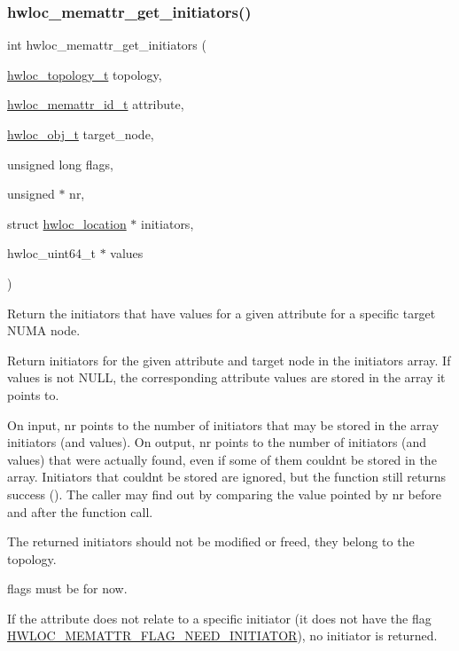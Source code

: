 \subsubsection{\texorpdfstring{hwloc\+\_\+memattr\+\_\+get\+\_\+initiators()}{hwloc\_memattr\_get\_initiators()}}
{\footnotesize\ttfamily int hwloc\+\_\+memattr\+\_\+get\+\_\+initiators (\begin{DoxyParamCaption}\item[{\hyperlink{a00186_ga9d1e76ee15a7dee158b786c30b6a6e38}{hwloc\+\_\+topology\+\_\+t}}]{topology,  }\item[{\hyperlink{a00211_gacc82003a8610be554615995f0996c888}{hwloc\+\_\+memattr\+\_\+id\+\_\+t}}]{attribute,  }\item[{\hyperlink{a00185_ga79b8ab56877ef99ac59b833203391c7d}{hwloc\+\_\+obj\+\_\+t}}]{target\+\_\+node,  }\item[{unsigned long}]{flags,  }\item[{unsigned $\ast$}]{nr,  }\item[{struct \hyperlink{a00314}{hwloc\+\_\+location} $\ast$}]{initiators,  }\item[{hwloc\+\_\+uint64\+\_\+t $\ast$}]{values }\end{DoxyParamCaption})}



Return the initiators that have values for a given attribute for a specific target N\+U\+MA node. 

Return initiators for the given attribute and target node in the {\ttfamily initiators} array. If {\ttfamily values} is not {\ttfamily N\+U\+LL}, the corresponding attribute values are stored in the array it points to.

On input, {\ttfamily nr} points to the number of initiators that may be stored in the array {\ttfamily initiators} (and {\ttfamily values}). On output, {\ttfamily nr} points to the number of initiators (and values) that were actually found, even if some of them couldn\textquotesingle{}t be stored in the array. Initiators that couldn\textquotesingle{}t be stored are ignored, but the function still returns success ({}). The caller may find out by comparing the value pointed by {\ttfamily nr} before and after the function call.

The returned initiators should not be modified or freed, they belong to the topology.

{\ttfamily flags} must be {} for now.

If the attribute does not relate to a specific initiator (it does not have the flag \hyperlink{a00212_gga78aceb4cac4d614c0f5e82dbfeb779e5a9d16523e285b2e22cfc78cc84dce8c96}{H\+W\+L\+O\+C\+\_\+\+M\+E\+M\+A\+T\+T\+R\+\_\+\+F\+L\+A\+G\+\_\+\+N\+E\+E\+D\+\_\+\+I\+N\+I\+T\+I\+A\+T\+OR}), no initiator is returned.

